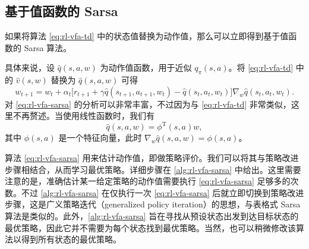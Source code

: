 \subsection{基于值函数的 Sarsa}
\label{sec:rl-vfa-sarsa}

如果将算法 \cref{eq:rl-vfa-td} 中的状态值替换为动作值，那么可以立即得到基于值函数的 Sarsa 算法。

具体来说，设 $\hat{q}(s,a,w)$ 为动作值函数，用于近似 $q_{\pi}(s,a)$。将 \cref{eq:rl-vfa-td} 中的 $\hat{v}(s,w)$ 替换为 $\hat{q}(s,a,w)$ 可得
\begin{equation}
w_{t+1} = w_{t} + \alpha_{t} \Big[r_{t+1} + \gamma \hat{q}(s_{t+1}, a_{t+1}, w_{t}) - \hat{q}(s_{t}, a_{t}, w_{t})\Big] \nabla_{w} \hat{q}(s_{t}, a_{t}, w_{t}).
\label{eq:rl-vfa-sarsa}
\end{equation}
对 \cref{eq:rl-vfa-sarsa} 的分析可以非常丰富，不过因为与 \cref{eq:rl-vfa-td} 非常类似，这里不再赘述。当使用线性函数时，我们有
\begin{equation*}
\hat{q}(s, a, w) = \phi^{\mathrm{T}}(s, a) w,
\end{equation*}
其中 $\phi(s,a)$ 是一个特征向量，此时 $\nabla_w\hat{q}(s,a,w) = \phi(s,a)$。

算法 \cref{eq:rl-vfa-sarsa} 用来估计动作值，即做策略评价。我们可以将其与策略改进步骤相结合，从而学习最优策略。详细步骤在 \cref{alg:rl-vfa-sarsa} 中给出。这里需要注意的是，准确估计某一给定策略的动作值需要执行 \cref{eq:rl-vfa-sarsa} 足够多的次数。不过 \cref{alg:rl-vfa-sarsa} 在仅执行一次 \cref{eq:rl-vfa-sarsa} 后就立即切换到策略改进步骤，这是广义策略迭代（generalized policy iteration）的思想，与表格式 Sarsa 算法是类似的。此外，\cref{alg:rl-vfa-sarsa} 旨在寻找从预设状态出发到达目标状态的最优策略，因此它并不需要为每个状态找到最优策略。当然，也可以稍微修改该算法以得到所有状态的最优策略。


